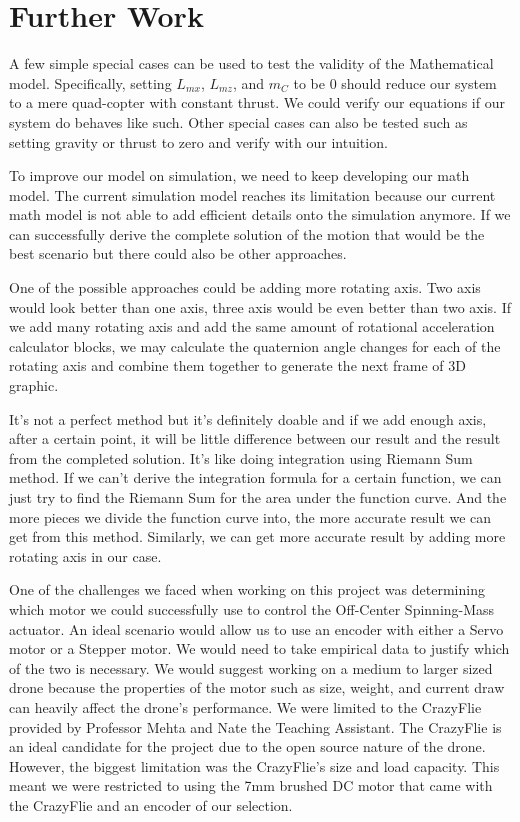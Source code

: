 \section{Further Work}  
A few simple special cases can be used to test the validity of the Mathematical model. Specifically, setting $L_{mx}$, $L_{mz}$, and $m_C$ to be 0 should reduce our system to a mere quad-copter with constant thrust. We could verify our equations if our system do behaves like such. Other special cases can also be tested such as setting gravity or thrust to zero and verify with our intuition.
\par 
To improve our model on simulation, we need to keep developing our math model. The current simulation model reaches its limitation because our current math model is not able to add efficient details onto the simulation anymore. If we can successfully derive the complete solution of the motion that would be the best scenario but there could also be other approaches. 
\par
One of the possible approaches could be adding more rotating axis. Two axis would look better than one axis, three axis would be even better than two axis. If we add many rotating axis and add the same amount of rotational acceleration calculator blocks, we may calculate the quaternion angle changes for each of the rotating axis and combine them together to generate the next frame of 3D graphic.
\par
It's not a perfect method but it's definitely doable and if we add enough axis, after a certain point, it will be little difference between our result and the result from the completed solution. It's like doing integration using Riemann Sum method. If we can't derive the integration formula for a certain function, we can just try to find the Riemann Sum for the area under the function curve. And the more pieces we divide the function curve into, the more accurate result we can get from this method. Similarly, we can get more accurate result by adding more rotating axis in our case.
\par
One of the challenges we faced when working on this project was determining which motor we could successfully use to control the Off-Center Spinning-Mass actuator. An ideal scenario would allow us to use an encoder with either a Servo motor or a Stepper motor. We would need to take empirical data to justify which of the two is necessary. We would suggest working on a medium to larger sized drone because the properties of the motor such as size, weight, and current draw can heavily affect the drone's performance. We were limited to the CrazyFlie provided by Professor Mehta and Nate the Teaching Assistant. The CrazyFlie is an ideal candidate for the project due to the open source nature of the drone. However, the biggest limitation was the CrazyFlie's size and load capacity. This meant we were restricted to using the 7mm brushed DC motor that came with the CrazyFlie and an encoder of our selection.  \par
